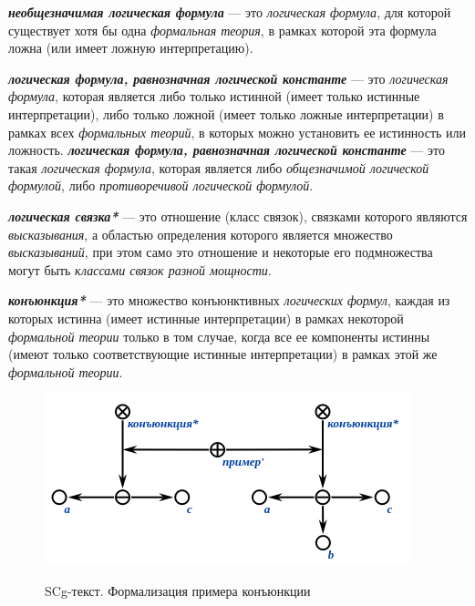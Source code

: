 \textbf{\textit{необщезначимая логическая формула}} --- это \textit{логическая формула}, для которой существует хотя бы одна \textit{формальная теория}, в рамках которой эта формула ложна (или имеет ложную интерпретацию).

\textbf{\textit{логическая формула, равнозначная логической константе}} --- это \textit{логическая формула}, которая является либо только истинной (имеет только истинные интерпретации), либо только ложной (имеет только ложные интерпретации) в рамках всех \textit{формальных теорий}, в которых можно установить ее истинность или ложность.
\textbf{\textit{логическая формула, равнозначная логической константе}} --- это такая \textit{логическая формула}, которая является либо \textit{общезначимой логической формулой}, либо \textit{противоречивой логической формулой}.

\begin{SCn}
\end{SCn}

\textbf{\textit{логическая связка*}} --- это отношение (класс связок), связками которого являются \textit{высказывания}, а областью определения которого является множество \textit{высказываний}, при этом само это отношение и некоторые его подмножества могут быть \textit{классами связок разной мощности}.

\begin{SCn}
\end{SCn}

\textbf{\textit{конъюнкция*}} --- это множество конъюнктивных \textit{логических формул}, каждая из которых истинна (имеет истинные интерпретации) в рамках некоторой \textit{формальной теории} только в том случае, когда все ее компоненты истинны (имеют только соответствующие истинные интерпретации) в рамках этой же \textit{формальной теории}. 

\begin{figure}[H]
	\caption{SCg-текст. Формализация примера конъюнкции}
	\includegraphics[scale=0.8]{author/part2/figures/logic/conjunction.png}
	\label{fig:conjunction}
\end{figure}

